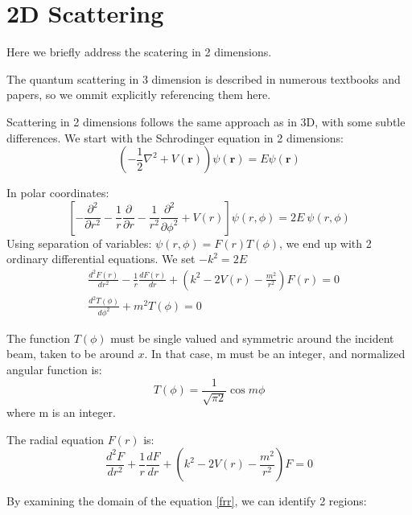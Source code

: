 \chapter{2D Scattering}

Here we briefly address the scatering in 2 dimensions.

The quantum scattering in 3 dimension is described in numerous textbooks and papers, so we ommit explicitly referencing them here.

Scattering in 2 dimensions follows the same approach as in 3D, with some subtle differences.
We start with the Schrodinger equation in 2 dimensions:
\begin{equation}\label{2DS1}
    \left(-\frac{1}{2}\nabla^2 + V(\mathbf{r})\right)\psi(\mathbf{r}) = E\psi(\mathbf{r})
\end{equation}

In polar coordinates:
\begin{equation}
    \left[-\frac{\partial^2}{\partial r^2} - \frac{1}{r}\frac{\partial}{\partial r} - \frac{1}{r^2}\frac{\partial^2}{\partial\phi^2} + V(r)\right]\psi(r,\phi) = 2E\ \psi(r,\phi)
\end{equation}
Using separation of variables: $ \psi(r,\phi) = F(r)T(\phi) $, we end up with 2 ordinary differential equations. We set $ -k^2 = 2E $
\begin{equation}
\begin{split}
 & \frac{d^2F(r)}{d r^2} -\frac{1}{r}\frac{d F(r)}{d r} +(k^2 -  2V(r) - \frac{m^2}{r^2})F(r) = 0\\[.8em]
 & \frac{d^2 T(\phi)}{d \phi^2} + m^2 T(\phi) = 0
\end{split}
\end{equation}

The function $ T(\phi) $ must be single valued and symmetric around the incident beam, taken to be around $ x $. In that case, m must be an integer, and normalized angular function is:
\begin{equation}
T(\phi) = \frac{1}{\sqrt{\pi 2}}\cos{m\phi}
\end{equation}
where m is an integer.

The radial equation $ F(r) $ is:
\begin{equation}\label{frr}
\frac{d^2 F}{dr^2} + \frac{1}{r}\frac{dF}{dr} + \left(k^2 - 2V(r) - \frac{m^2}{r^2}\right)F = 0
\end{equation}

By examining the domain of the equation \eqref{frr},  we can identify 2 regions:

